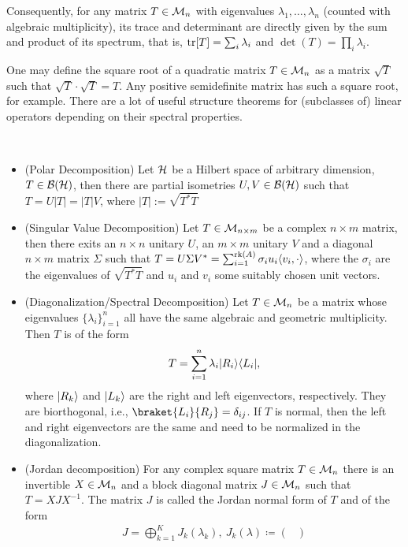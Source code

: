 Consequently, for any matrix $T \in \mathcal M_n$ with eigenvalues $\lambda_1, \dots, \lambda_n$ (counted with algebraic multiplicity), its trace and determinant are directly given by the sum and product of its spectrum, that is, $\mathrm{tr}[T] = \sum_i \lambda_i$ and $\det(T) = \prod_i \lambda_i$.

One may define the square root of a quadratic matrix $T \in \mathcal M_n$ as a matrix $\sqrt{T}$ such that $\sqrt{T}\cdot \sqrt{T} = T$. Any positive semidefinite matrix has such a square root, for example.
There are a lot of useful structure theorems for (subclasses of) linear operators depending on their spectral properties.
\begin{theorem}
\
    \begin{itemize}
    \item (Polar Decomposition) Let $\mathcal{H}$ be a Hilbert space of arbitrary dimension, $T \in \mathcal B(\mathcal{H})$, then there are partial isometries $U,V \in \mathcal B(\mathcal{H})$ such that $T= U|T| = |T|V$, where $|T|:= \sqrt{T^*T}$
    \item (Singular Value Decomposition) Let $T\in \mathcal M_{n\times m}$ be a complex $n\times m$ matrix, then there exits an $n\times n$ unitary $U$, an $m\times m$ unitary $V$ and a diagonal $n \times m$ matrix $\Sigma$ such that $T = U\Sigma V^* = \sum_{i=1}^{\mathrm{rk}(A)} \sigma_i u_i \langle v_i, \cdot \rangle$, where the $\sigma_i$ are the eigenvalues of $\sqrt{T^*T}$ and $u_i$ and $v_i$ some suitably chosen unit vectors.
    \item (Diagonalization/Spectral Decomposition) Let $T\in \mathcal M_n$ be a matrix whose eigenvalues $\{\lambda_i\}_{i=1}^n$ all have the same algebraic and geometric multiplicity. Then $T$ is of the form 
    \begin{align*}
        T = \sum_{i=1}^n \lambda_i \lvert R_i\rangle\langle L_i\rvert,
    \end{align*}
    where $\lvert R_k\rangle$ and $\lvert L_k\rangle$ are the right and left eigenvectors, respectively. They are biorthogonal, i.e., $\braket{L_i}{R_j} = \delta_{ij}$. If $T$ is normal, then the left and right eigenvectors are the same and need to be normalized in the diagonalization.
    \item (Jordan decomposition) For any complex square matrix $T\in \mathcal M_n$ there is an invertible $X \in \mathcal M_n$ and a block diagonal matrix $J \in \mathcal M_n$ such that $T = XJX^{-1}$. The matrix $J$ is called the Jordan normal form of $T$ and of the form
    \begin{align*}
        J = \bigoplus_{k=1}^K J_k(\lambda_k), \ J_k(\lambda) \coloneqq \begin{pmatrix}

\end{pmatrix}
\end{align*}
\end{itemize}
\end{theorem}
